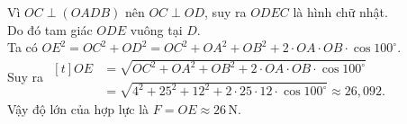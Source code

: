 \begin{bt}
{	}
	\noindent
	Vì $OC \perp (OADB)$ nên $OC \perp OD$, suy ra $ODEC$ là hình chữ nhật.\\
	Do đó tam giác $ODE$ vuông tại $D$.\\
	Ta có $OE^2=OC^2+OD^2=OC^2+OA^2+OB^2+2\cdot OA\cdot OB\cdot\cos 100^{\circ}$.\\
	Suy ra 
	$\begin{aligned}[t]
		OE
		&=\sqrt{OC^2+OA^2+OB^2+2\cdot OA\cdot OB\cdot\cos 100^{\circ}}\\
		&=\sqrt{4^2+25^2+12^2+2\cdot 25\cdot 12\cdot \cos 100^{\circ}} \approx 26{,}092.
	\end{aligned}$\\
	Vậy độ lớn của hợp lực là $F=OE \approx 26 \mathrm{\,N}$.
\end{bt}

